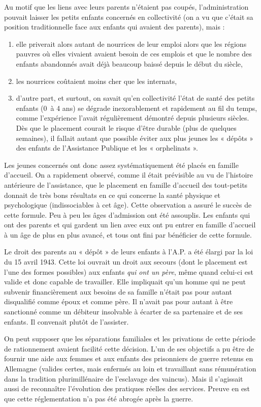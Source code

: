  Au motif que les liens avec leurs parents n'étaient pas coupés, l'administration pouvait laisser les petits enfants concernés en collectivité (on a vu que c'était sa position traditionnelle face aux enfants qui avaient des parents), mais :
\begin{enumerate}
\item elle priverait alors autant de nourrices de leur emploi alors que les régions pauvres où elles vivaient avaient besoin de ces emplois et que le nombre des enfants abandonnés avait déjà beaucoup baissé depuis le début du siècle,
\item les nourrices coûtaient moins cher que les internats,
\item d'autre part, et surtout, on savait qu'en collectivité l'état de santé des petits enfants (0~à 4 ans) se dégrade inexorablement et rapidement au fil du temps, comme l'expérience l'avait régulièrement démontré depuis plusieurs siècles. Dès que le placement courait le risque d'être durable (plus de quelques semaines), il fallait autant que possible éviter aux plus jeunes les « dépôts » des enfants de l'Assistance Publique et les « orphelinats ».
\end{enumerate}
 Les jeunes concernés ont donc assez systématiquement été placés en famille d'accueil. On a rapidement observé, comme il était prévisible au vu de l'histoire antérieure de l'assistance, que le placement en famille d'accueil des tout-petits donnait de très bons résultats en ce qui concerne la santé physique et psychologique (indissociables à cet âge). Cette observation a assuré le succès de cette formule. Peu à peu les âges d'admission ont été assouplis. Les enfants qui ont des parents et qui gardent un lien avec eux ont pu entrer en famille d'accueil à un âge de plus en plus avancé, et tous ont fini par bénéficier de cette formule. 

 Le droit des parents au « dépôt » de leurs enfants à l'A.P. a été élargi par la loi du 15 avril 1943. Cette loi ouvrait un droit aux secours (dont le placement est l'une des formes possibles) aux enfants \emph{qui ont un père}, même quand celui-ci est valide et donc capable de travailler. Elle impliquait qu'un homme qui ne peut subvenir financièrement aux besoins de sa famille n'était pas pour autant disqualifié comme époux et comme père. Il n'avait pas pour autant à être sanctionné comme un débiteur insolvable à écarter de sa partenaire et de ses enfants. Il convenait plutôt de l'assister.

 On peut supposer que les séparations familiales et les privations de cette période de rationnement avaient facilité cette décision. L'un de ses objectifs a pu être de fournir une aide aux femmes et aux enfants des prisonniers de guerre retenus en Allemagne (valides certes, mais enfermés au loin et travaillant sans rémunération dans la tradition plurimillénaire de l'esclavage des vaincus). Mais il s'agissait aussi de reconnaître l'évolution des pratiques réelles des services. Preuve en est que cette réglementation n'a pas été abrogée après la guerre. 

